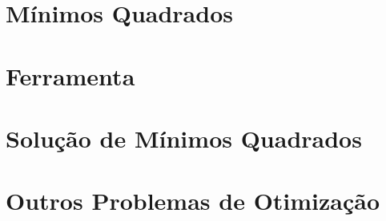 \documentclass{beamer}
\begin{document}
  \frame{\titlepage}

  \section{Mínimos Quadrados}
    
    
    

  \section{Ferramenta}
    

  \section{Solução de Mínimos Quadrados}
    

  \section{Outros Problemas de Otimização}
    
    

  \appendix
  
\end{document}
